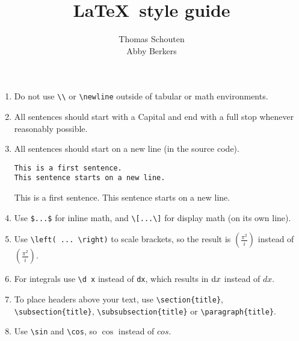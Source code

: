 \documentclass[11pt]{article}
\title{\LaTeX\ style guide}
\author{Thomas Schouten \\ Abby Berkers}
\begin{document}
    \maketitle
    \begin{enumerate}
        \item Do not use \verb|\\| or \verb|\newline| outside of tabular or math environments.

        \item All sentences should start with a Capital and end with a full stop whenever reasonably possible.

        \item All sentences should start on a new line (in the source code).
        \begin{lstlisting}
This is a first sentence.
This sentence starts on a new line.
        \end{lstlisting}
        This is a first sentence.
        This sentence starts on a new line.

        \item Use \verb|$...$| for inline math, and \verb|\[...\]| for display math (on its own line).

        \item Use \verb|\left( ... \right)| to scale brackets, so the result is $\left( \frac{\pi^2}{i} \right)$ instead of $(\frac{\pi^2}{i})$.

        \item For integrals use \verb|\d x| instead of \verb|dx|, which results in $\mathop{}\!\mathrm{d} x$ instead of $dx$.

        \item To place headers above your text, use \verb|\section{title}|, \verb|\subsection{title}|, \verb|\subsubsection{title}| or \verb|\paragraph{title}|.

        \item Use \verb|\sin| and \verb|\cos|, so $\cos$ instead of $cos$.


\end{enumerate}
\end{document}
